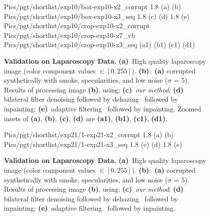 \begin{figure}[!h]
     {Pics/pgt/shortlist/exp10/box-exp10-x2_corrupt} {1.8} {(a)} {(b)}
     {Pics/pgt/shortlist/exp10/box-exp10-x3_seq} {1.8} {(c)} {(d)}
     {1.8} {(e)}
     {Pics/pgt/shortlist/exp10/crop-exp10-x2_corrupt} {Pics/pgt/shortlist/exp10/crop-exp10-x7_vb} {Pics/pgt/shortlist/exp10/crop-exp10-x3_seq}  {(a1)} {(b1)} {(c1)} {(d1)}
    \caption
    {
        {\bf Validation on Laparoscopy Data. }
        {\bf (a)}~High quality laparoscopy image (color component values $\in [0,255]$).
        {\bf (b)}:~{\bf (a)} corrupted synthetically with smoke, specularities, and low noise ($\sigma$ = 5).
        Results of processing image {\bf (b)}, using:
        {\bf (c)}~{\em our method};
        {\bf (d)}~ bilateral filter denoising followed by dehazing~\cite{he2011dark} followed by inpainting;
        {\bf (e)}~adaptive filtering~\cite{gibson2013wiener} followed by inpainting.
        Zoomed insets of {\bf (a)}, {\bf (b)}, {\bf (c)}, {\bf (d)} are {\bf (a1)}, {\bf (b1)}, {\bf (c1)}, {\bf (d1)}.
    }
    \label{fig:imagesPgt2}
\end{figure}

\begin{figure}[!h]
     {Pics/pgt/shortlist/exp21/1-exp21-x2_corrupt} {1.8} {(a)} {(b)}
     {Pics/pgt/shortlist/exp21/1-exp21-x3_seq}  {1.8} {(c)} {(d)}
     {1.8} {(e)}
    \caption
    {
        {\bf Validation on Laparoscopy Data. }
        {\bf (a)}~High quality laparoscopy image (color component values $\in [0,255]$).
        {\bf (b)}:~{\bf (a)} corrupted synthetically with smoke, specularities, and low noise ($\sigma$ = 5).
        Results of processing image {\bf (b)}, using:
        {\bf (c)}~{\em our method};
        {\bf (d)}~ bilateral filter denoising followed by dehazing~\cite{he2011dark} followed by inpainting;
        {\bf (e)}~adaptive filtering~\cite{gibson2013wiener} followed by inpainting.
    }
    \label{fig:imagesPgt3}
\end{figure}

